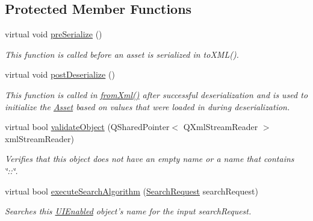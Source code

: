 \subsection*{Protected Member Functions}
\begin{DoxyCompactItemize}
\item 
virtual void \hyperlink{class_picto_1_1_u_i_enabled_aa465db35db425df38af40754218249d7}{pre\-Serialize} ()
\begin{DoxyCompactList}\small\item\em This function is called before an asset is serialized in to\-X\-M\-L(). \end{DoxyCompactList}\item 
virtual void \hyperlink{class_picto_1_1_u_i_enabled_ae1585113a496ff2c8de3293aa884b57b}{post\-Deserialize} ()
\begin{DoxyCompactList}\small\item\em This function is called in \hyperlink{class_picto_1_1_asset_a8bed4da09ecb1c07ce0dab313a9aba67}{from\-Xml()} after successful deserialization and is used to initialize the \hyperlink{class_picto_1_1_asset}{Asset} based on values that were loaded in during deserialization. \end{DoxyCompactList}\item 
\hypertarget{class_picto_1_1_u_i_enabled_a64686f0f0e7608905a61259a8b31bb7b}{virtual bool \hyperlink{class_picto_1_1_u_i_enabled_a64686f0f0e7608905a61259a8b31bb7b}{validate\-Object} (Q\-Shared\-Pointer$<$ Q\-Xml\-Stream\-Reader $>$ xml\-Stream\-Reader)}\label{class_picto_1_1_u_i_enabled_a64686f0f0e7608905a61259a8b31bb7b}

\begin{DoxyCompactList}\small\item\em Verifies that this object does not have an empty name or a name that contains \char`\"{}\-::\char`\"{}. \end{DoxyCompactList}\item 
\hypertarget{class_picto_1_1_u_i_enabled_a97cb540bf9702a5af91a9eeddde39db9}{virtual bool \hyperlink{class_picto_1_1_u_i_enabled_a97cb540bf9702a5af91a9eeddde39db9}{execute\-Search\-Algorithm} (\hyperlink{struct_search_request}{Search\-Request} search\-Request)}\label{class_picto_1_1_u_i_enabled_a97cb540bf9702a5af91a9eeddde39db9}

\begin{DoxyCompactList}\small\item\em Searches this \hyperlink{class_picto_1_1_u_i_enabled}{U\-I\-Enabled} object's name for the input search\-Request. \end{DoxyCompactList}\end{DoxyCompactItemize}
